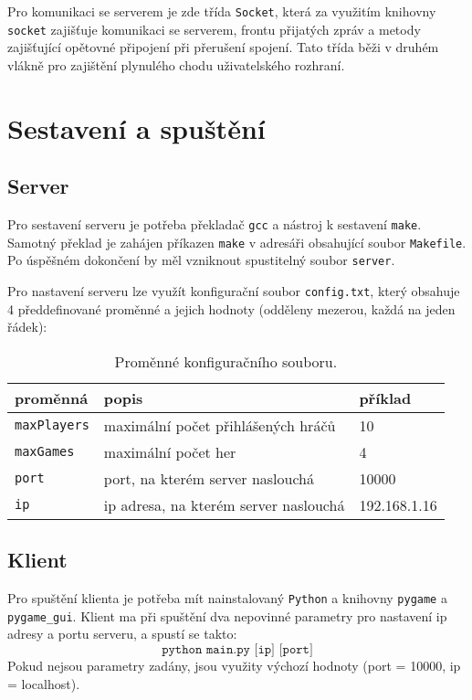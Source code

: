 \documentclass[11pt,a4paper]{article}
\begin{document}
Pro komunikaci se serverem je zde třída \texttt{Socket}, která za využitím knihovny \texttt{socket} zajišťuje komunikaci se serverem, frontu přijatých zpráv a metody zajišťující opětovné připojení při přerušení spojení. Tato třída běži v druhém vlákně pro zajištění plynulého chodu uživatelského rozhraní.

\section{Sestavení a spuštění}
\subsection{Server}
Pro sestavení serveru je potřeba překladač \texttt{gcc} a nástroj k sestavení \texttt{make}. Samotný překlad je zahájen příkazen \texttt{make} v adresáři obsahující soubor \texttt{Makefile}. Po úspěšném dokončení by měl vzniknout spustitelný soubor \texttt{server}.

Pro nastavení serveru lze využít konfigurační soubor \texttt{config.txt}, který obsahuje 4 předdefinované proměnné a jejich hodnoty (odděleny mezerou, každá na jeden řádek):

\begin{table}[H]
	\begin{center}
		\begin{tabular}[c]{l|l|l}
			proměnná & popis & příklad \\ \hline
			\texttt{maxPlayers} & maximální počet přihlášených hráčů & 10 \\
			\texttt{maxGames} & maximální počet her & 4 \\
			\texttt{port} & port, na kterém server naslouchá & 10000 \\
			\texttt{ip} & ip adresa, na kterém server naslouchá & 192.168.1.16 \\
		\end{tabular}
	\end{center}
	\caption{Proměnné konfiguračního souboru.}
\end{table}

\subsection{Klient}
Pro spuštění klienta je potřeba mít nainstalovaný \texttt{Python} a knihovny \texttt{pygame} a \texttt{pygame\_gui}. Klient ma při spuštění dva nepovinné parametry pro nastavení ip adresy a portu serveru, a spustí se takto:
$$ \texttt{python main.py [ip] [port]}$$
Pokud nejsou parametry zadány, jsou využity výchozí hodnoty (port = 10000, ip = localhost).
\end{document}
